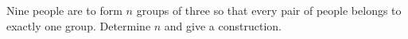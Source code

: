 Nine people are to form $n$ groups of three so that every pair of people belongs to exactly one group. Determine $n$ and give a construction.
